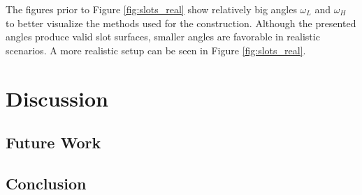 \documentclass[a4paper, 11pt]{report}
\theoremstyle{definition}
\begin{document}
	The figures prior to Figure \ref{fig:slots_real} show relatively big angles $\omega_L$ and $\omega_H$ to better visualize the methods used for the construction. Although the presented angles produce valid slot surfaces, smaller angles are favorable in realistic scenarios. A more realistic setup can be seen in Figure \ref{fig:slots_real}.

\chapter{Discussion}

\section{Future Work}
\section{Conclusion}

\printbibliography[heading=bibnumbered, title=References]
\end{document}
